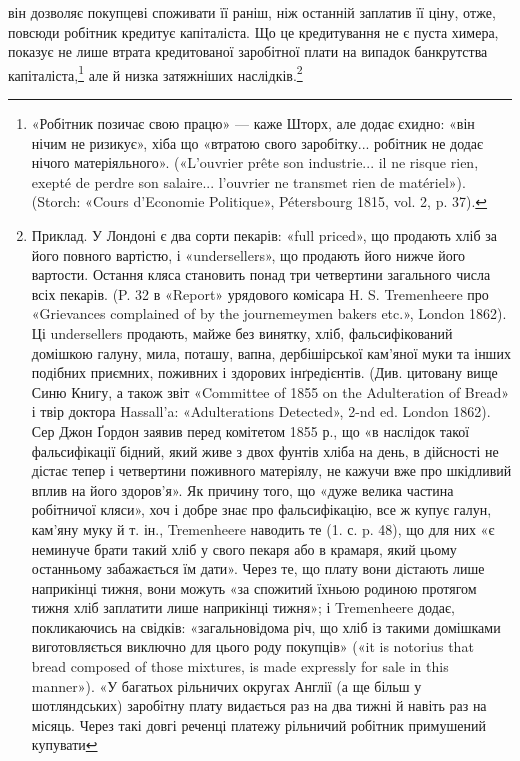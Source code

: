 \parcont{}  %
він дозволяє покупцеві споживати її раніш, ніж останній заплатив
її ціну, отже, повсюди робітник кредитує капіталіста. Що це
кредитування не є пуста химера, показує не лише втрата кредитованої
заробітної плати на випадок банкрутства капіталіста,\footnote{
«Робітник позичає свою працю» — каже Шторх, але додає єхидно:
«він нічим не ризикує», хіба що «втратою свого заробітку... робітник не
додає нічого матеріяльного». («L’ouvrier prête son industrie... il ne risque
rien, exepté de perdre son salaire... l’ouvrier ne transmet rien de matériel»).
(Storch: «Cours d’Economie Politique», Pétersbourg 1815, vol. 2, p. 37).
}
але й низка затяжніших наслідків.\footnote{
Приклад. У Лондоні є два сорти пекарів: «full priced», що продають
хліб за його повного вартістю, і «undersellers», що продають його
нижче його вартости. Остання кляса становить понад три четвертини
загального числа всіх пекарів. (P. 32 в «Report» урядового комісара
H. S. Tremenheere про «Grievances complained of by the journemeymen
bakers etc.», London 1862). Ці undersellers продають, майже без винятку,
хліб, фальсифікований домішкою галуну, мила, поташу, вапна, дербішірської
кам’яної муки та інших подібних приємних, поживних і здорових
інґредієнтів. (Див. цитовану вище Синю Книгу, а також звіт «Committee
of 1855 on the Adulteration of Bread» і твір доктора Hassall’a: «Adulterations
Detected», 2-nd ed. London 1862). Сер Джон Ґордон заявив
перед комітетом 1855 р., що «в наслідок такої фальсифікації бідний, який
живе з двох фунтів хліба на день, в дійсності не дістає тепер і четвертини
поживного матеріялу, не кажучи вже про шкідливий вплив на його здоров’я».
Як причину того, що «дуже велика частина робітничої кляси»,
хоч і добре знає про фальсифікацію, все ж купує галун, кам’яну муку
й т. ін., Tremenheere наводить те (1. с. p. 48), що для них «є неминуче
брати такий хліб у свого пекаря або в крамаря, який цьому останньому
забажається їм дати». Через те, що плату вони дістають лише наприкінці
тижня, вони можуть «за спожитий їхньою родиною протягом
тижня хліб заплатити лише наприкінці тижня»; і Tremenheere додає,
покликаючись на свідків: «загальновідома річ, що хліб із такими домішками
виготовляється виключно для цього роду покупців» («it is notorius
that bread composed of those mixtures, is made expressly for sale in this
manner»). «У багатьох рільничих округах Англії (а ще більш у шотляндських)
заробітну плату видається раз на два тижні й навіть раз на місяць.
Через такі довгі реченці платежу рільничий робітник примушений купувати
}
